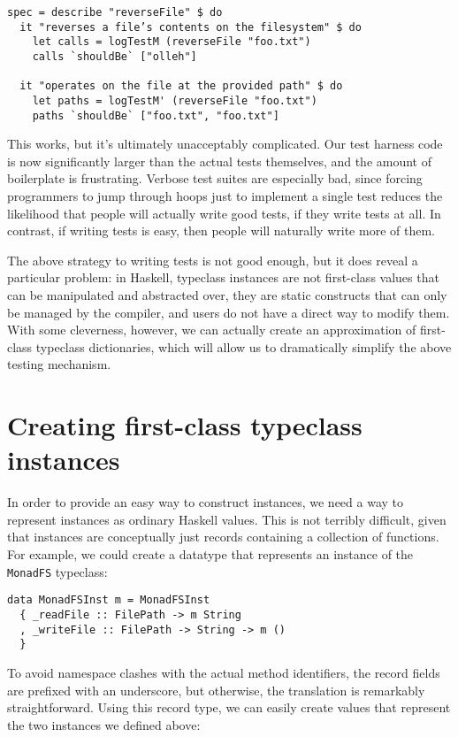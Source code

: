 \begin{verbatim}
spec = describe "reverseFile" $ do
  it "reverses a file’s contents on the filesystem" $ do
    let calls = logTestM (reverseFile "foo.txt")
    calls `shouldBe` ["olleh"]

  it "operates on the file at the provided path" $ do
    let paths = logTestM' (reverseFile "foo.txt")
    paths `shouldBe` ["foo.txt", "foo.txt"]
\end{verbatim}
This works, but it's ultimately unacceptably complicated. Our test
harness code is now significantly larger than the actual tests
themselves, and the amount of boilerplate is frustrating. Verbose test
suites are especially bad, since forcing programmers to jump through
hoops just to implement a single test reduces the likelihood that people
will actually write good tests, if they write tests at all. In contrast,
if writing tests is easy, then people will naturally write more of them.

The above strategy to writing tests is not good enough, but it does
reveal a particular problem: in Haskell, typeclass instances are not
first-class values that can be manipulated and abstracted over, they are
static constructs that can only be managed by the compiler, and users do
not have a direct way to modify them. With some cleverness, however, we
can actually create an approximation of first-class typeclass
dictionaries, which will allow us to dramatically simplify the above
testing mechanism.

\section{Creating first-class typeclass
instances}
\label{creating-first-class-typeclass-instances}

In order to provide an easy way to construct instances, we need a way to
represent instances as ordinary Haskell values. This is not terribly
difficult, given that instances are conceptually just records containing
a collection of functions. For example, we could create a datatype that
represents an instance of the \texttt{MonadFS} typeclass:

\begin{verbatim}
data MonadFSInst m = MonadFSInst
  { _readFile :: FilePath -> m String
  , _writeFile :: FilePath -> String -> m ()
  }
\end{verbatim}
To avoid namespace clashes with the actual method identifiers, the
record fields are prefixed with an underscore, but otherwise, the
translation is remarkably straightforward. Using this record type, we
can easily create values that represent the two instances we defined
above:

